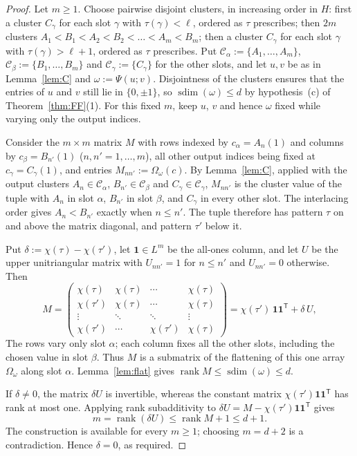 \documentclass[11pt]{amsart}
\theoremstyle{definition}
\theoremstyle{remark}
\numberwithin{equation}{section}
\newcommand{\cC}{\mathcal{C}}
\newcommand{\rank}{\operatorname{rank}}
\newcommand{\sdim}{\operatorname{sdim}}
\theoremstyle{plain}
\theoremstyle{definition}
\theoremstyle{plain}
\begin{document}
\begin{proof}
Let $m\ge1$. Choose pairwise disjoint clusters, in increasing order in $H$: first a cluster $C_\gamma$ for each slot
$\gamma$ with $\tau(\gamma)<\ell$, ordered as $\tau$ prescribes; then $2m$ clusters $A_1<B_1<A_2<B_2<\dots<A_m<B_m$; then a
cluster $C_\gamma$ for each slot $\gamma$ with $\tau(\gamma)>\ell+1$, ordered as $\tau$ prescribes. Put
$\cC_\alpha:=\{A_1,\dots,A_m\}$, $\cC_\beta:=\{B_1,\dots,B_m\}$ and $\cC_\gamma:=\{C_\gamma\}$ for the other slots, and let
$u,v$ be as in Lemma~\ref{lem:C} and $\omega:=\Psi(u;v)$. Disjointness of the clusters ensures that the entries of
$u$ and $v$ still lie in $\{0,\pm1\}$, so $\sdim(\omega)\le d$ by hypothesis~(c) of Theorem~\ref{thm:FF}(1).
For this fixed $m$, keep $u$, $v$ and hence $\omega$ fixed while varying only the output indices.

Consider the $m\times m$ matrix $M$ with rows indexed by $c_\alpha=A_n(1)$ and columns by $c_\beta=B_{n'}(1)$
($n,n'=1,\dots,m$), all other output indices being fixed at $c_\gamma=C_\gamma(1)$, and entries $M_{nn'}:=\Omega_\omega(c)$.
By Lemma~\ref{lem:C}, applied with the output clusters $A_n\in\cC_\alpha$, $B_{n'}\in\cC_\beta$ and $C_\gamma\in\cC_\gamma$,
$M_{nn'}$ is the cluster value of the tuple with $A_n$ in slot $\alpha$, $B_{n'}$ in slot $\beta$, and $C_\gamma$ in
every other slot. The interlacing order gives $A_n<B_{n'}$ exactly when $n\le n'$. The tuple therefore has pattern
$\tau$ on and above the matrix diagonal, and pattern $\tau'$ below it.

Put $\delta:=\chi(\tau)-\chi(\tau')$, let $\mathbf 1\in L^m$ be the all-ones column, and let $U$ be the upper
unitriangular matrix with $U_{nn'}=1$ for $n\le n'$ and $U_{nn'}=0$ otherwise. Then
\[
M=\begin{pmatrix}
\chi(\tau)&\chi(\tau)&\cdots&\chi(\tau)\\
\chi(\tau')&\chi(\tau)&\cdots&\chi(\tau)\\
\vdots&\ddots&\ddots&\vdots\\
\chi(\tau')&\cdots&\chi(\tau')&\chi(\tau)
\end{pmatrix}
=\chi(\tau')\,\mathbf 1\mathbf 1^{\mathsf T}+\delta\,U,
\]
The rows vary only slot $\alpha$; each column fixes all the other slots, including the chosen value in slot $\beta$.
Thus $M$ is a submatrix of the flattening of this one array $\Omega_\omega$ along slot $\alpha$. Lemma~\ref{lem:flat}
gives $\rank M\le\sdim(\omega)\le d$.

If $\delta\ne0$, the matrix $\delta U$ is invertible, whereas the constant matrix
$\chi(\tau')\mathbf 1\mathbf 1^{\mathsf T}$ has rank at most one. Applying rank subadditivity to
$\delta U=M-\chi(\tau')\mathbf 1\mathbf 1^{\mathsf T}$ gives
\[
m=\rank(\delta U)\le\rank M+1\le d+1.
\]
The construction is available for every $m\ge1$; choosing $m=d+2$ is a contradiction. Hence $\delta=0$, as required.
\end{proof}
\end{document}
